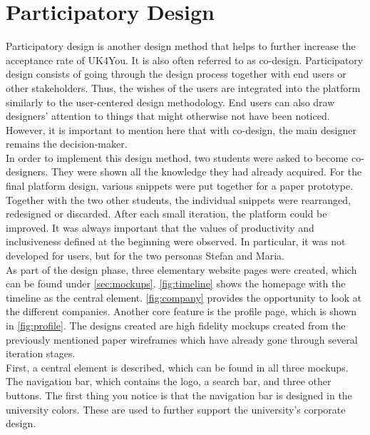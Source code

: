 \section{Participatory Design}
Participatory design is another design method that helps to further increase the acceptance rate of UK4You\cite{participatory-design-spinuzzi}.
It is also often referred to as co-design.
Participatory design consists of going through the design process together with end users or other stakeholders.
Thus, the wishes of the users are integrated into the platform similarly to the user-centered design methodology.
End users can also draw designers' attention to things that might otherwise not have been noticed.
However, it is important to mention here that with co-design, the main designer remains the decision-maker.\\

In order to implement this design method, two students were asked to become co-designers.
They were shown all the knowledge they had already acquired.
For the final platform design, various snippets were put together for a paper prototype.
Together with the two other students, the individual snippets were rearranged, redesigned or discarded.
After each small iteration, the platform could be improved.
It was always important that the values of productivity and inclusiveness defined at the beginning were observed.
In particular, it was not developed for users, but for the two personas Stefan and Maria.\\

As part of the design phase, three elementary website pages were created, which can be found under \autoref{sec:mockups}.
\autoref{fig:timeline} shows the homepage with the timeline as the central element.
\autoref{fig:company} provides the opportunity to look at the different companies.
Another core feature is the profile page, which is shown in \autoref{fig:profile}.
The designs created are high fidelity mockups created from the previously mentioned paper wireframes which have already gone through several iteration stages.\\

First, a central element is described, which can be found in all three mockups.
The navigation bar, which contains the logo, a search bar, and three other buttons.
The first thing you notice is that the navigation bar is designed in the university colors\cite{uni-kassel-colors}.
These are used to further support the university's corporate design.\\


